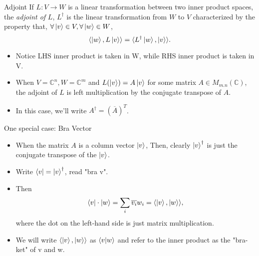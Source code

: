 \documentclass[handout, 10 pt]{beamer}
\begin{document}
\begin{frame}{Adjoint}
    If $L:V \to W$ is a linear transformation between two inner product spaces, the {\emph{adjoint of }}$L$, $L^\dagger$ is the linear transformation from $W$ to $V$ characterized by the property that, $\forall \ket{v} \in V, \forall \ket{w} \in W$,
\begin{equation}
    \langle\ket{w}, L\ket{v}\rangle=\langle L^\dagger \ket{w}, \ket{v}\rangle .
\end{equation}
\pause
\begin{itemize}
    \item Notice LHS inner product is taken in W, while RHS inner product is taken in V.
    \pause
    \item When $V={\mathbb{C}}^n, W={\mathbb{C}}^m$ and $L(\ket{v})=A\ket{v}$ for some matrix $A \in M_{m.n}(\mathbb{C})$, the adjoint of $L$ is left multiplication by the conjugate transpose of $A$.  
    \pause
    \item In this case, we'll write $A^\dagger=(\overline{A})^T$.
\end{itemize}
\end{frame}

\begin{comment}
Such is the motivation for the "bra-ket" notation, a convention in quantum mechanics.
\end{comment}
\begin{frame}{One special case: Bra Vector}
\begin{itemize}
    \item When the matrix $A$ is a column vector $\ket{v}$, Then, clearly $\ket{v}^\dagger$ is just the conjugate transpose of the $\ket{v}$.
    \pause
    \item Write $\bra{v}={\ket{v}}^\dagger$, read "bra v".
    \pause
    \item Then
    \begin{equation}
    \bra{v}\cdot \ket{w}=\sum_i \overline{v_i}w_i=\langle \ket{v},\ket{w}\rangle,
    \end{equation}
    where the dot on the left-hand side is just matrix multiplication.
    \pause
    \item We will write $\langle \ket{v},\ket{w}\rangle$ as $\braket{v|w}$ and refer to the inner product as the "bra-ket" of v and w.
\end{itemize}
\end{frame}
\end{document}
